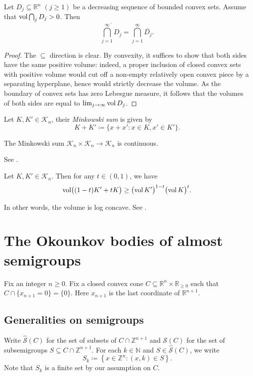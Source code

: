 \begin{lemma}\label{lma:intconvexset}
    Let $D_j\subseteq \mathbb{R}^n$ $(j\geq 1)$ be a decreasing sequence of bounded convex sets. Assume that $\operatorname{vol} \bigcap_j D_j>0$. Then
    \[
    \overline{\bigcap_{j=1}^{\infty}D_j}=\bigcap_{j=1}^{\infty}\overline{D_j}.
    \]
\end{lemma}
\begin{proof}
    The $\subseteq$ direction is clear. By convexity, it suffices to show that both sides have the same positive volume: indeed, a proper inclusion of closed convex sets with positive volume would cut off a non-empty relatively open convex piece by a separating hyperplane, hence would strictly decrease the volume. As the boundary of convex sets has zero Lebesgue measure, it follows that the volumes of both sides are equal to $\lim_{j\to\infty}\operatorname{vol} D_j$.
\end{proof}


\begin{definition}\label{def:almostsg:L138}
    Let $K,K'\in \mathcal{K}_n$, their \emph{Minkowski sum} is given by
    \[
    K+K'\coloneqq \{x+x': x\in K,x'\in K'\}.
    \]
\end{definition}
\begin{proposition}
    The Minkowski sum $\mathcal{K}_n\times \mathcal{K}_n\rightarrow \mathcal{K}_n$ is continuous.
\end{proposition}
See \cite[Page~139]{Sch14}.
\begin{theorem}\label{thm:BrunnMin}
    Let $K,K'\in \mathcal{K}_n$. Then for any $t\in (0,1)$, we have
    \[
    \operatorname{vol}\bigl((1-t)K'+tK\bigr)\geq \bigl(\operatorname{vol} K'\bigr)^{1-t}\bigl(\operatorname{vol} K\bigr)^t.
    \]
\end{theorem}
In other words, the volume is log concave. See \cite[Page~372]{Sch14}.




\section{The Okounkov bodies of almost semigroups}\label{sec:clo}
Fix an integer $n\geq 0$. Fix a closed convex cone $C\subseteq \mathbb{R}^{n}\times \mathbb{R}_{\geq 0}$ such that $C\cap \{x_{n+1}=0\}=\{0\}$. Here $x_{n+1}$ is the last coordinate of $\mathbb{R}^{n+1}$.
\subsection{Generalities on semigroups}
\label{subsec:asg_general}
Write $\hat{\mathcal{S}}(C)$ for the set of subsets of $C\cap \mathbb{Z}^{n+1}$ and $\mathcal{S}(C)$ for the set of subsemigroups $S\subseteq C\cap \mathbb{Z}^{n+1}$. For each $k\in \mathbb{N}$ and $S\in \hat{\mathcal{S}}(C)$, we write
\[
S_k\coloneqq \left\{x\in \mathbb{Z}^n: (x,k)\in S \right\}.
\]
Note that $S_k$ is a finite set by our assumption on $C$.

